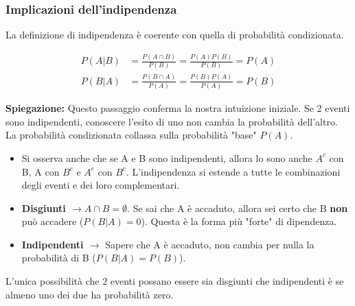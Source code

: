 \documentclass[a4paper, 11pt]{article}
\theoremstyle{definition}
\begin{document}
\subsubsection*{Implicazioni dell'indipendenza}
La definizione di indipendenza è coerente con quella di probabilità condizionata.
\begin{formulabox}
    \begin{align*}
        P(A|B) &= \frac{P(A \cap B)}{P(B)} = \frac{P(A)P(B)}{P(B)} = P(A) \\
        P(B|A) &= \frac{P(B \cap A)}{P(A)} = \frac{P(B)P(A)}{P(A)} = P(B)
    \end{align*}
\end{formulabox}
\textbf{Spiegazione:} Questo passaggio conferma la nostra intuizione iniziale. Se 2 eventi sono indipendenti, conoscere l'esito di uno non cambia la probabilità dell'altro. La probabilità condizionata collassa sulla probabilità "base" $P(A)$.
\begin{itemize}
    \item Si osserva anche che se A e B sono indipendenti, allora lo sono anche $A^c$ con B, A con $B^c$ e $A^c$ con $B^c$. L'indipendenza si estende a tutte le combinazioni degli eventi e dei loro complementari.
\end{itemize}

\begin{tcolorbox}[colback=red!10!white, colframe=red!75!black, title=ATTENZIONE: Eventi Disgiunti e Indipendenti sono DIVERSI]
\begin{itemize}
    \item \textbf{Disgiunti $\rightarrow A \cap B = \emptyset$}. Se sai che A è accaduto, allora sei certo che B \textbf{non} può accadere ($P(B|A) = 0$). Questa è la forma più "forte" di dipendenza.
    \item \textbf{Indipendenti $\rightarrow$} Sapere che A è accaduto, non cambia per nulla la probabilità di B ($P(B|A) = P(B)$).
\end{itemize}
L'unica possibilità che 2 eventi possano essere sia disgiunti che indipendenti è se almeno uno dei due ha probabilità zero.
\end{tcolorbox}
\end{document}
